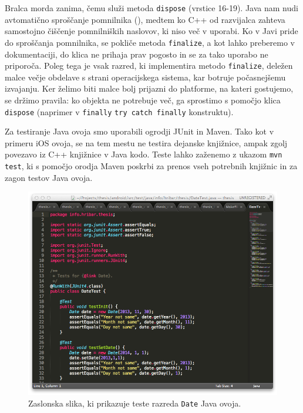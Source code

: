 Bralca morda zanima, čemu služi metoda \texttt{dispose} (vrstice 16-19). Java nam nudi avtomatično sproščanje pomnilnika (), medtem ko C++ od razvijalca zahteva samostojno čiščenje pomnilniških naslovov, ki niso več v uporabi. Ko v Javi pride do sproščanja pomnilnika, se pokliče metoda \texttt{finalize}, a kot lahko preberemo v dokumentaciji\cite{android-object}, do klica ne prihaja prav pogosto in se za tako uporabo ne priporoča. Poleg tega je vsak razred, ki implementira metodo \texttt{finalize}, deležen malce večje obdelave s strani operacijskega sistema, kar botruje počasnejšemu izvajanju. Ker želimo biti malce bolj prijazni do platforme, na kateri gostujemo, se držimo pravila: ko objekta ne potrebuje več, ga sprostimo s pomočjo klica \texttt{dispose} (naprimer v \texttt{finally} \texttt{try catch finally} konstruktu).

Za testiranje Java ovoja smo uporabili ogrodji JUnit\cite{junit} in Maven\cite{maven}. Tako kot v primeru iOS ovoja, se na tem mestu ne testira dejanske knjižnice, ampak zgolj povezavo iz C++ knjižnice v Java kodo. Teste lahko zaženemo z ukazom \texttt{mvn test}, ki s pomočjo orodja Maven poskrbi za prenos vseh potrebnih knjižnic in za zagon testov Java ovoja.

\begin{figure}
 \includegraphics[width=\linewidth]{java-tests}
 \caption{Zaslonska slika, ki prikazuje teste razreda \texttt{Date} Java ovoja.}
 \label{fig:java-tests}
\end{figure}

